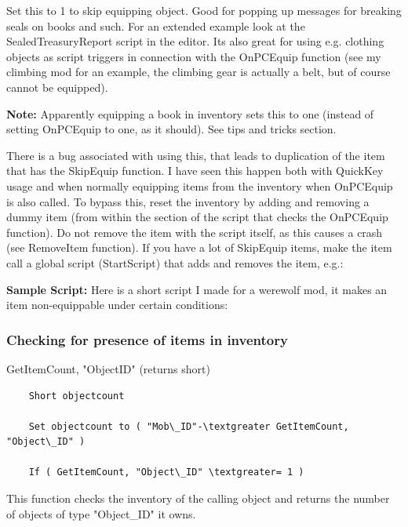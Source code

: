 Set this to 1 to skip equipping object. Good for popping up messages for
breaking seals on books and such. For an extended example look at the
SealedTreasuryReport script in the editor. Its also great for using e.g.
clothing objects as script triggers in connection with the OnPCEquip
function (see my climbing mod for an example, the climbing gear is
actually a belt, but of course cannot be equipped).

\textbf{Note:} Apparently equipping a book in inventory sets this to one
(instead of setting OnPCEquip to one, as it should). See tips and tricks
section.

There is a bug associated with using this, that leads to duplication of
the item that has the SkipEquip function. I have seen this happen both
with QuickKey usage and when normally equipping items from the inventory
when OnPCEquip is also called. To bypass this, reset the inventory by
adding and removing a dummy item (from within the section of the script
that checks the OnPCEquip function). Do not remove the item with the
script itself, as this causes a crash (see RemoveItem function). If you
have a lot of SkipEquip items, make the item call a global script
(StartScript) that adds and removes the item, e.g.:



\textbf{Sample Script:} Here is a short script I made for a werewolf
mod, it makes an item non-equippable under certain conditions:



\hypertarget{checking-for-presence-of-items-in-inventory}{%
\subsubsection{Checking for presence of items in
inventory}\label{checking-for-presence-of-items-in-inventory}}

	GetItemCount, "ObjectID" (returns short)

\begin{lstlisting}	
	Short objectcount
	
	Set objectcount to ( "Mob\_ID"-\textgreater GetItemCount, "Object\_ID" )
	
	If ( GetItemCount, "Object\_ID" \textgreater= 1 )
\end{lstlisting}

This function checks the inventory of the calling object and returns the
number of objects of type "Object\_ID" it owns.


